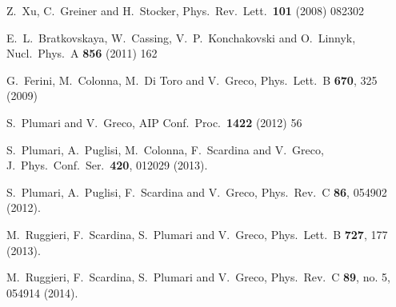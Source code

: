 \documentclass[aps,prc,a4paper,nofootinbib,
preprintnumbers,superscriptaddress,twocolumn,showpacs,showkeys]{revtex4}
\begin{document}
\begin{thebibliography}{99}
  Z.~Xu, C.~Greiner and H.~Stocker,
  Phys.\ Rev.\ Lett.\  {\bf 101} (2008) 082302

  E.~L.~Bratkovskaya, W.~Cassing, V.~P.~Konchakovski and O.~Linnyk,
  Nucl.\ Phys.\ A {\bf 856} (2011) 162
    
    
  G.~Ferini, M.~Colonna, M.~Di Toro and V.~Greco,
  Phys.\ Lett.\ B {\bf 670}, 325 (2009)
    
  S.~Plumari and V.~Greco,
  AIP Conf.\ Proc.\  {\bf 1422} (2012) 56
  
  
  S.~Plumari, A.~Puglisi, M.~Colonna, F.~Scardina and V.~Greco,
  J.\ Phys.\ Conf.\ Ser.\  {\bf 420}, 012029 (2013).

  S.~Plumari, A.~Puglisi, F.~Scardina and V.~Greco,
  Phys.\ Rev.\ C {\bf 86}, 054902 (2012).

  M.~Ruggieri, F.~Scardina, S.~Plumari and V.~Greco,
  Phys.\ Lett.\ B {\bf 727}, 177 (2013).
  
  M.~Ruggieri, F.~Scardina, S.~Plumari and V.~Greco,
  Phys.\ Rev.\ C {\bf 89}, no. 5, 054914 (2014).



\end{thebibliography}
\end{document}
